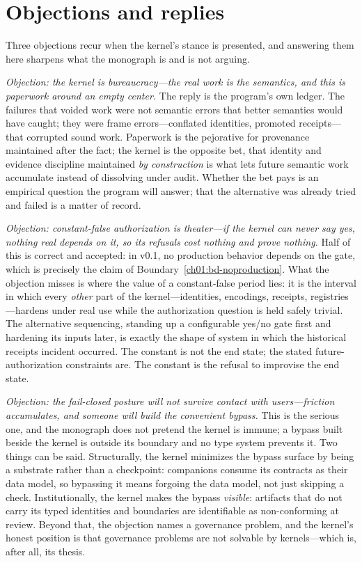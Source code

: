 \section{Objections and replies}\label{ch01:objections}

Three objections recur when the kernel's stance is presented, and
answering them here sharpens what the monograph is and is not
arguing.

\emph{Objection: the kernel is bureaucracy---the real work is the
semantics, and this is paperwork around an empty center.} The reply
is the program's own ledger. The failures that voided work were not
semantic errors that better semantics would have caught; they were
frame errors---conflated identities, promoted receipts---that
corrupted sound work. Paperwork is the pejorative for provenance
maintained after the fact; the kernel is the opposite bet, that
identity and evidence discipline maintained \emph{by construction}
is what lets future semantic work accumulate instead of dissolving
under audit. Whether the bet pays is an empirical question the
program will answer; that the alternative was already tried and
failed is a matter of record.

\emph{Objection: constant-false authorization is theater---if the
kernel can never say yes, nothing real depends on it, so its
refusals cost nothing and prove nothing.} Half of this is correct
and accepted: in v0.1, no production behavior depends on the gate,
which is precisely the claim of
Boundary~\ref{ch01:bd-noproduction}. What the objection misses is
where the value of a constant-false period lies: it is the interval
in which every \emph{other} part of the kernel---identities,
encodings, receipts, registries---hardens under real use while the
authorization question is held safely trivial. The alternative
sequencing, standing up a configurable yes/no gate first and
hardening its inputs later, is exactly the shape of system in which
the historical receipts incident occurred. The constant is not the
end state; the stated future-authorization constraints are. The
constant is the refusal to improvise the end state.

\emph{Objection: the fail-closed posture will not survive contact
with users---friction accumulates, and someone will build the
convenient bypass.} This is the serious one, and the monograph does
not pretend the kernel is immune; a bypass built beside the kernel
is outside its boundary and no type system prevents it. Two things
can be said. Structurally, the kernel minimizes the bypass surface
by being a substrate rather than a checkpoint: companions consume
its contracts as their data model, so bypassing it means forgoing
the data model, not just skipping a check. Institutionally, the
kernel makes the bypass \emph{visible}: artifacts that do not carry
its typed identities and boundaries are identifiable as
non-conforming at review. Beyond that, the objection names a
governance problem, and the kernel's honest position is that
governance problems are not solvable by kernels---which is, after
all, its thesis.


